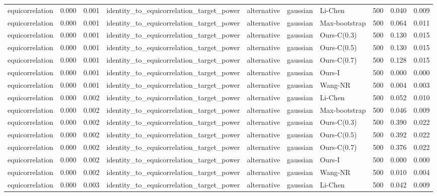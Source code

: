 \begin{tabular}{lrrllllrrr}
equicorrelation & 0.000 & 0.001 & identity\_to\_equicorrelation\_target\_power & alternative & gaussian & Li-Chen & 500 & 0.040 & 0.009 \\
equicorrelation & 0.000 & 0.001 & identity\_to\_equicorrelation\_target\_power & alternative & gaussian & Max-bootstrap & 500 & 0.064 & 0.011 \\
equicorrelation & 0.000 & 0.001 & identity\_to\_equicorrelation\_target\_power & alternative & gaussian & Ours-C(0.3) & 500 & 0.130 & 0.015 \\
equicorrelation & 0.000 & 0.001 & identity\_to\_equicorrelation\_target\_power & alternative & gaussian & Ours-C(0.5) & 500 & 0.130 & 0.015 \\
equicorrelation & 0.000 & 0.001 & identity\_to\_equicorrelation\_target\_power & alternative & gaussian & Ours-C(0.7) & 500 & 0.128 & 0.015 \\
equicorrelation & 0.000 & 0.001 & identity\_to\_equicorrelation\_target\_power & alternative & gaussian & Ours-I & 500 & 0.000 & 0.000 \\
equicorrelation & 0.000 & 0.001 & identity\_to\_equicorrelation\_target\_power & alternative & gaussian & Wang-NR & 500 & 0.004 & 0.003 \\
equicorrelation & 0.000 & 0.002 & identity\_to\_equicorrelation\_target\_power & alternative & gaussian & Li-Chen & 500 & 0.052 & 0.010 \\
equicorrelation & 0.000 & 0.002 & identity\_to\_equicorrelation\_target\_power & alternative & gaussian & Max-bootstrap & 500 & 0.046 & 0.009 \\
equicorrelation & 0.000 & 0.002 & identity\_to\_equicorrelation\_target\_power & alternative & gaussian & Ours-C(0.3) & 500 & 0.390 & 0.022 \\
equicorrelation & 0.000 & 0.002 & identity\_to\_equicorrelation\_target\_power & alternative & gaussian & Ours-C(0.5) & 500 & 0.392 & 0.022 \\
equicorrelation & 0.000 & 0.002 & identity\_to\_equicorrelation\_target\_power & alternative & gaussian & Ours-C(0.7) & 500 & 0.376 & 0.022 \\
equicorrelation & 0.000 & 0.002 & identity\_to\_equicorrelation\_target\_power & alternative & gaussian & Ours-I & 500 & 0.000 & 0.000 \\
equicorrelation & 0.000 & 0.002 & identity\_to\_equicorrelation\_target\_power & alternative & gaussian & Wang-NR & 500 & 0.010 & 0.004 \\
equicorrelation & 0.000 & 0.003 & identity\_to\_equicorrelation\_target\_power & alternative & gaussian & Li-Chen & 500 & 0.042 & 0.009 \\

\end{tabular}
